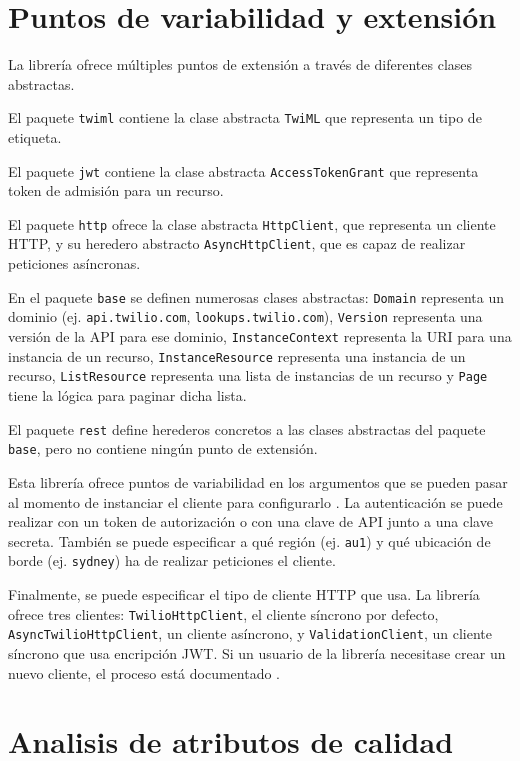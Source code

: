 \documentclass{article}
\begin{document}
\section{Puntos de variabilidad y extensión}

La librería ofrece múltiples puntos de extensión
a través de diferentes clases abstractas.

El paquete \verb|twiml| contiene la clase abstracta \verb|TwiML|
que representa un tipo de etiqueta.

El paquete \verb|jwt| contiene la clase abstracta \verb|AccessTokenGrant|
que representa token de admisión para un recurso.

El paquete \verb|http| ofrece la clase abstracta
\verb|HttpClient|, que representa un cliente HTTP,
y su heredero abstracto \verb|AsyncHttpClient|,
que es capaz de realizar peticiones asíncronas.

En el paquete \verb|base| se definen numerosas clases abstractas:
\verb|Domain| representa un dominio
(ej. \verb|api.twilio.com|, \verb|lookups.twilio.com|),
\verb|Version| representa una versión de la API para ese dominio,
\verb|InstanceContext| representa la URI para una instancia de un recurso,
\verb|InstanceResource| representa una instancia de un recurso,
\verb|ListResource| representa una lista de instancias de un recurso
y \verb|Page| tiene la lógica para paginar dicha lista.

El paquete \verb|rest| define herederos concretos a las clases abstractas
del paquete \verb|base|, pero no contiene ningún punto de extensión.

\hfill

Esta librería ofrece puntos de variabilidad
en los argumentos que se pueden pasar
al momento de instanciar el cliente para configurarlo
\cite{readme}.
La autenticación se puede realizar con un token de autorización o
con una clave de API junto a una clave secreta.
También se puede especificar a qué región (ej. \verb|au1|)
y qué ubicación de borde (ej. \verb|sydney|)
ha de realizar peticiones el cliente.

Finalmente, se puede especificar el tipo de cliente HTTP que usa.
La librería ofrece tres clientes:
\verb|TwilioHttpClient|, el cliente síncrono por defecto,
\verb|AsyncTwilioHttpClient|, un cliente asíncrono, y
\verb|ValidationClient|, un cliente síncrono que usa encripción JWT.
Si un usuario de la librería necesitase crear un nuevo cliente,
el proceso está documentado
\cite{crear-cliente-http}.

\section{Analisis de atributos de calidad}
\end{document}
